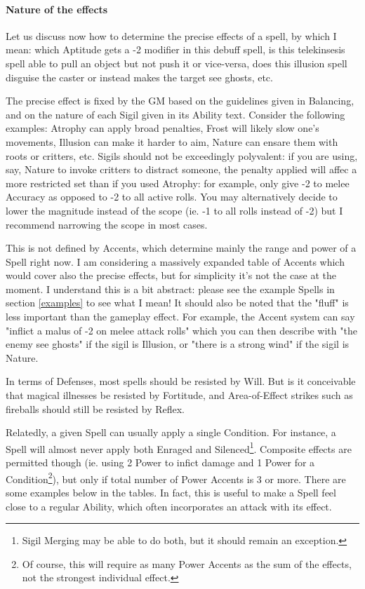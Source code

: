 \paragraph{Nature of the effects}

Let us discuss now how to determine the precise effects of a spell, by which I mean: which Aptitude gets a -2 modifier in this debuff spell, is this telekinsesis spell able to pull an object but not push it or vice-versa, does this illusion spell disguise the caster or instead makes the target see ghosts, etc. 

The precise effect is fixed by the GM based on the guidelines given in Balancing, and on the nature of each Sigil given in its Ability text. Consider the following examples: Atrophy can apply broad penalties, Frost will likely slow one's movements, Illusion can make it harder to aim, Nature can ensare them with roots or critters, etc. Sigils should not be exceedingly polyvalent: if you are using, say, Nature to invoke critters to distract someone, the penalty applied will affec a more restricted set than if you used Atrophy: for example, only give -2 to melee Accuracy as opposed to -2 to all active rolls. You may alternatively decide to lower the magnitude instead of the scope (ie. -1 to all rolls instead of -2) but I recommend narrowing the scope in most cases.

This is not defined by Accents, which determine mainly the range and power of a Spell right now. I am considering a massively expanded table of Accents which would cover also the precise effects, but for simplicity it's not the case at the moment. I understand this is a bit abstract: please see the example Spells in section \ref{examples} to see what I mean! It should also be noted that the "fluff" is less important than the gameplay effect. For example, the Accent system can say "inflict a malus of -2 on melee attack rolls" which you can then describe with "the enemy see ghosts" if the sigil is Illusion, or "there is a strong wind" if the sigil is Nature.


In terms of Defenses, most spells should be resisted by Will. But is it conceivable that magical illnesses be resisted by Fortitude, and Area-of-Effect strikes such as fireballs should still be resisted by Reflex.

Relatedly, a given Spell can usually apply a single Condition. For instance, a Spell will almost never apply both Enraged and Silenced\footnote{Sigil Merging may be able to do both, but it should remain an exception.}. Composite effects are permitted though (ie. using 2 Power to infict damage and 1 Power for a Condition\footnote{Of course, this will require as many Power Accents as the sum of the effects, not the strongest individual effect.}), but only if total number of Power Accents is 3 or more. There are some examples below in the tables. In fact, this is useful to make a Spell feel close to a regular Ability, which often incorporates an attack with its effect.


